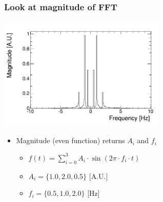 \documentclass[bigger]{beamer}
\begin{document}
\begin{frame}
\frametitle{Look at magnitude of FFT}
\label{sec-2-1-2}
\label{sec-2-1-2-1}

\centering
\includegraphics[width=0.6\textwidth]{fig/tutorial_FFT_magnitude.png}
\begin{itemize}

\item Magnitude (even function) returns \(A_{i}\) and \(f_{i}\)
\label{sec-2-1-2-2}%
\begin{itemize}

\item \(f(t) = \sum_{i = 0}^3 A_{i} \cdot \sin (2\pi \cdot f_{i} \cdot t)\)
\label{sec-2-1-2-2-1}%

\item \(A_{i} = \{1.0, 2.0, 0.5\}\) [A.U.]
\label{sec-2-1-2-2-2}%

\item \(f_{i} = \{0.5, 1.0, 2.0\}\) [Hz]
\label{sec-2-1-2-2-3}%
\end{itemize} %
\end{itemize} %
\end{frame}
\end{document}

